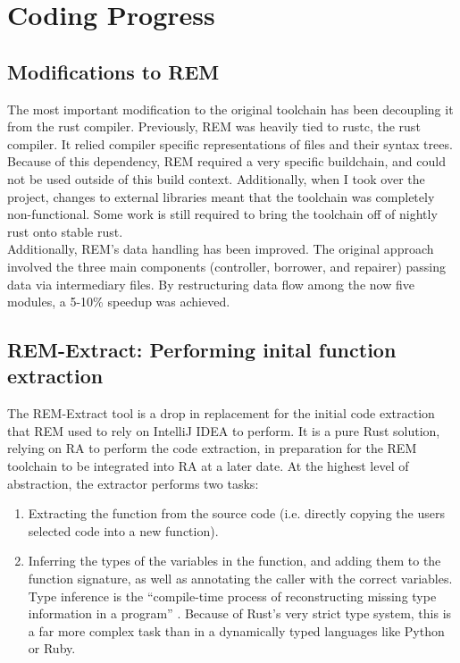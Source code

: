\section{Coding Progress}

\subsection*{Modifications to REM}

The most important modification to the original toolchain has been decoupling it
from the rust compiler. Previously, REM was heavily tied to rustc, the rust
compiler. It relied compiler specific representations of files and their syntax
trees. Because of this dependency, REM required a very specific buildchain, and
could not be used outside of this build context. Additionally, when I took over
the project, changes to external libraries meant that the toolchain was
completely non-functional. Some work is still required to bring the toolchain
off of nightly rust onto stable rust.\\
Additionally, REM’s data handling has been improved. The original approach
involved the three main components (controller, borrower, and repairer) passing
data via intermediary files. By restructuring data flow among the now five
modules, a 5-10\% speedup was achieved.

\subsection*{REM-Extract: Performing inital function extraction}

The REM-Extract tool is a drop in replacement for the initial code extraction
that REM used to rely on IntelliJ IDEA to perform. It is a pure Rust solution,
relying on RA to perform the code extraction, in preparation for the REM
toolchain to be integrated into RA at a later date. At the highest level of
abstraction, the extractor performs two tasks:

\begin{enumerate}
    \item Extracting the function from the source code (i.e. directly copying
    the users selected code into a new function).
    \item Inferring the types of the variables in the function, and adding them
    to the function signature, as well as annotating the caller with the correct
    variables. Type inference is the ``compile-time process of reconstructing
    missing type information in a program'' \cite{DUGGAN199637}. Because of
    Rust's very strict type system, this is a far more complex task than in a
    dynamically typed languages like Python or Ruby.
\end{enumerate}

